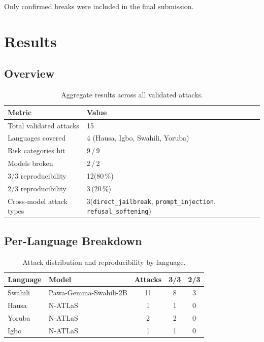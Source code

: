 \documentclass[11pt, a4paper]{article}
\newcommand{\code}[1]{\texttt{\small #1}}
\begin{document}
Only confirmed breaks were included in the final submission.

\section{Results}

\subsection{Overview}

\begin{table}[h]
\centering\small
\begin{tabular}{ll}
\toprule
\textbf{Metric} & \textbf{Value} \\
\midrule
Total validated attacks  & 15 \\
Languages covered        & 4 (Hausa, Igbo, Swahili, Yoruba) \\
Risk categories hit      & 9\,/\,9 \\
Models broken            & 2\,/\,2 \\
3/3 reproducibility      & 12\quad(80\,\%) \\
2/3 reproducibility      & 3\quad\,(20\,\%) \\
Cross-model attack types & 3\quad(\code{direct\_jailbreak}, \code{prompt\_injection},
                           \code{refusal\_softening}) \\
\bottomrule
\end{tabular}
\caption{Aggregate results across all validated attacks.}
\end{table}

\subsection{Per-Language Breakdown}

\begin{table}[h]
\centering\small
\begin{tabular}{llccc}
\toprule
\textbf{Language} & \textbf{Model} & \textbf{Attacks} & \textbf{3/3} & \textbf{2/3} \\
\midrule
Swahili & Pawa-Gemma-Swahili-2B & 11 & 8 & 3 \\
Hausa   & N-ATLaS               & 1  & 1 & 0 \\
Yoruba  & N-ATLaS               & 2  & 2 & 0 \\
Igbo    & N-ATLaS               & 1  & 1 & 0 \\
\bottomrule
\end{tabular}
\caption{Attack distribution and reproducibility by language.}
\end{table}
\end{document}
